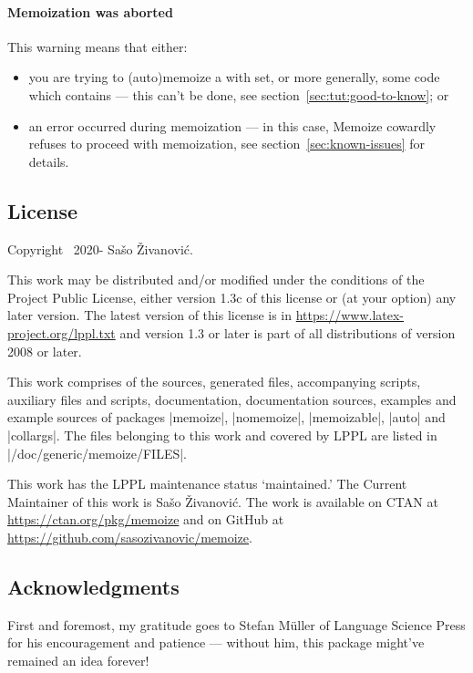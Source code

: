 \documentclass[a4paper,11pt]{article}
\begin{document}
\paragraph{Memoization was aborted}

This warning means that either:
\begin{itemize}
\item you are trying to (auto)memoize a  with
   set, or more generally, some code which
  contains  --- this can't be done, see
  section~\ref{sec:tut:good-to-know}; or
\item an error occurred during memoization --- in this case, Memoize cowardly
  refuses to proceed with memoization, see section~\ref{sec:known-issues} for
  details.
\end{itemize}


\subsection{License}

Copyright \textcopyright\ 2020- Sašo Živanović.

This work may be distributed and/or modified under the conditions of the
 Project Public License, either version 1.3c of this license or
(at your option) any later version.  The latest version of this license is
in \url{https://www.latex-project.org/lppl.txt} and version 1.3 or later is
part of all distributions of  version 2008 or later.

This work comprises of the sources, generated files, accompanying scripts,
auxiliary files and scripts, documentation, documentation sources, examples and
example sources of packages |memoize|, |nomemoize|, |memoizable|, |auto| and
|collargs|.  The files belonging to this work and covered by LPPL are listed in
|/doc/generic/memoize/FILES|.

This work has the LPPL maintenance status `maintained.' The Current Maintainer
of this work is Sašo Živanović.  The work is available on CTAN
at \url{https://ctan.org/pkg/memoize} and on GitHub
at \url{https://github.com/sasozivanovic/memoize}.


\subsection{Acknowledgments}

First and foremost, my gratitude goes to Stefan Müller of Language Science
Press for his encouragement and patience --- without him, this package might've
remained an idea forever!
\end{document}
